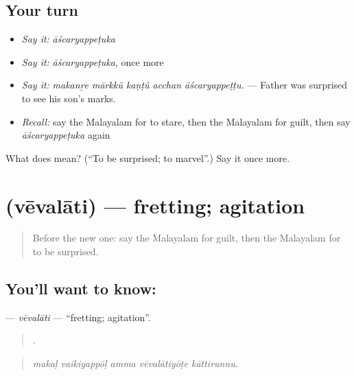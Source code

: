 \subsection*{Your turn}
\begin{itemize}
\raggedright
  \item \emph{Say it:} \emph{āścaryappeṭuka}
  \item \emph{Say it:} \emph{āścaryappeṭuka}, once more
  \item \emph{Say it:} \emph{makanṟe mārkkŭ kaṇṭŭ acchan āścaryappeṭṭu.} — Father was surprised to see his son's marks.
  \item \emph{Recall:} say the Malayalam for to stare, then the Malayalam for guilt, then say \emph{āścaryappeṭuka} again
\end{itemize}

\begin{tcolorbox}[breakable,colback=teal!4,colframe=teal!35!black,title={Before you move on}]
What does  mean? (\textquotedblleft{}To be surprised; to marvel\textquotedblright{}.) Say it once more.
\end{tcolorbox}
\section[\texorpdfstring{\ml{വേവലാതി} (vēvalāti)}{വേവലാതി (vēvalāti)}]{ (vēvalāti) — fretting; agitation}

\label{lesson:ML-C524-vevalati}



\begin{quote}
Before the new one: say the Malayalam for guilt, then the Malayalam for to be surprised.
\end{quote}

\subsection*{You'll want to know: }
\textbf{} — \emph{vēvalāti} — \textquotedblleft{}fretting; agitation\textquotedblright{}.

\begin{quote}
    .
\end{quote}

\begin{quote}
\emph{makaḷ vaikiyappōḷ amma vēvalātiyōṭe kāttirunnu.}
\end{quote}

